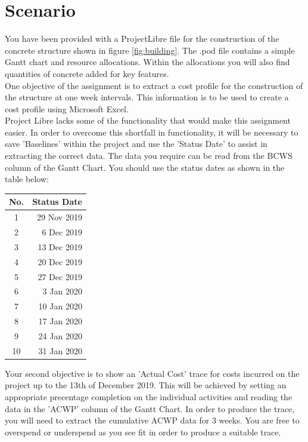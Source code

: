 \section*{Scenario}

You have been provided with a ProjectLibre file for the construction of the concrete structure shown in figure \ref{fig:building}.  The .pod file contains a simple Gantt chart and resource allocations.  Within the allocations you will also find quantities of concrete added for key features.\\

One objective of the assignment is to extract a cost profile for the construction of the structure at one week intervals.  This information is to be used to create a cost profile using Microsoft Excel.\\

Project Libre lacks some of the functionality that would make this assignment easier.  In order to overcome this shortfall in functionality, it will be necessary to save 'Baselines' within the project and use the 'Status Date' to assist in extracting the correct data.  The data you require can be read from the BCWS column of the Gantt Chart.  You should use the status dates as shown in the table below:


\begin{center}
	\begin{tabular}{ |c|r| }
		\hline
		\textbf{No.} & \textbf{Status Date} \\
		\hline 
		1 & 29 Nov 2019 \\ 
		2 &  6 Dec 2019 \\ 
		3 & 13 Dec 2019\\ 
		4 & 20 Dec 2019\\ 
		5 & 27 Dec 2019\\ 
		6 &  3 Jan 2020\\ 
		7 & 10 Jan 2020\\ 
		8 & 17 Jan 2020\\ 
		9 & 24 Jan 2020\\ 
		10 & 31 Jan 2020\\ 
		\hline
	\end{tabular}
\end{center}

Your second objective is to show an 'Actual Cost' trace for costs incurred on the project up to the 13th of December 2019.  This will be achieved by setting an appropriate precentage completion on the individual activities and reading the data in the 'ACWP' column of the Gantt Chart.  In order to produce the trace, you will need to extract the cumulative ACWP data for 3 weeks.  You are free to overspend or underspend as you see fit in order to produce a suitable trace.


